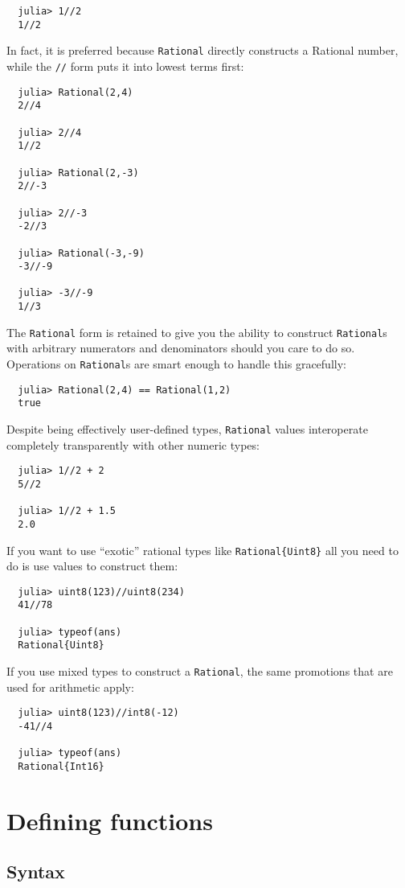 \documentclass{article}
\begin{document}
\begin{verbatim}
  julia> 1//2
  1//2
\end{verbatim}
In fact, it is preferred because \verb|Rational| directly constructs a Rational number, while the \verb|//| form puts it into lowest terms first:
\begin{verbatim}
  julia> Rational(2,4)
  2//4

  julia> 2//4
  1//2

  julia> Rational(2,-3)
  2//-3

  julia> 2//-3
  -2//3

  julia> Rational(-3,-9)
  -3//-9

  julia> -3//-9
  1//3
\end{verbatim}
The \verb|Rational| form is retained to give you the ability to construct \verb|Rational|s with arbitrary numerators and denominators should you care to do so. Operations on \verb|Rational|s are smart enough to handle this gracefully:
\begin{verbatim}
  julia> Rational(2,4) == Rational(1,2)
  true
\end{verbatim}
Despite being effectively user-defined types, \verb|Rational| values interoperate completely transparently with other numeric types:
\begin{verbatim}
  julia> 1//2 + 2
  5//2

  julia> 1//2 + 1.5
  2.0
\end{verbatim}
If you want to use ``exotic'' rational types like \verb|Rational{Uint8}| all you need to do is use \verb|| values to construct them:
\begin{verbatim}
  julia> uint8(123)//uint8(234)
  41//78

  julia> typeof(ans)
  Rational{Uint8}
\end{verbatim}
If you use mixed types to construct a \verb|Rational|, the same promotions that are used for arithmetic apply:
\begin{verbatim}
  julia> uint8(123)//int8(-12)
  -41//4

  julia> typeof(ans)
  Rational{Int16}
\end{verbatim}

\section{Defining functions}
\subsection{Syntax}
\end{document}
